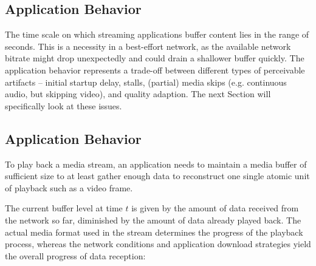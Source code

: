


\subsection{Application Behavior}

The time scale on which streaming applications buffer content lies in the range of seconds. This is a necessity in a best-effort network, as the available network bitrate might drop unexpectedly and could drain a shallower buffer quickly. %
The application behavior represents a trade-off between different types of perceivable artifacts -- initial startup delay, stalls, (partial) media skips (e.g. continuous audio, but skipping video), and quality adaption. The next Section will specifically look at these issues.




\subsection{Application Behavior}

%

To play back a media stream, an application needs to maintain a media buffer of sufficient size to at least gather enough data to reconstruct one single atomic unit of playback such as a video frame.

The current buffer level at time $t$ is given by the amount of data received from the network so far, diminished by the amount of data already played back. The actual media format used in the stream determines the progress of the playback process, whereas the network conditions and application download strategies yield the overall progress of data reception:

